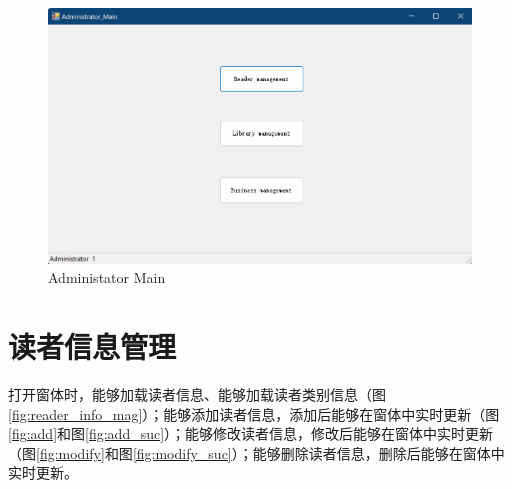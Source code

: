 \documentclass{article}
\begin{document}
\begin{figure}[H]
    \centering
    \includegraphics[width=1\textwidth]{../pic/admin_main.png}
    \caption{Administator Main}
    \label{fig:admin_main}
\end{figure}


\section{读者信息管理}
打开窗体时，能够加载读者信息、能够加载读者类别信息（图\ref{fig:reader_info_mag}）；能够添加读者信息，添加后能够在窗体中实时更新（图\ref{fig:add}和图\ref{fig:add_suc}）；能够修改读者信息，修改后能够在窗体中实时更新（图\ref{fig:modify}和图\ref{fig:modify_suc}）；能够删除读者信息，删除后能够在窗体中实时更新。
\end{document}

